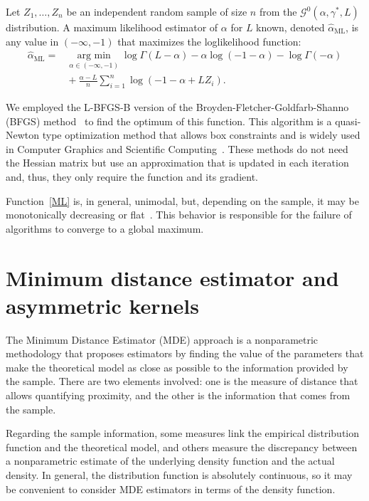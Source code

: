 \documentclass[twocolumn]{svjour3}
\newcommand{\argmin}{\operatorname*{\text{arg min }}}
\begin{document}
	Let $Z_1,\dots, Z_n$ be an independent random sample of size $n$ from the $\mathcal G^0(\alpha,\gamma^*,L)$ distribution.
	A maximum likelihood estimator of $\alpha$ for $L$ known, denoted $\widehat\alpha_{\text{{ML}}}$, is any value in $(-\infty,-1)$ that maximizes the loglikelihood function:
	\begin{align}
	\hat{\alpha}_{\text{{ML}}}=&\argmin_{\alpha \in (-\infty,-1)}\log \Gamma(L-\alpha)-
	\alpha\log(-1-\alpha)-\log\Gamma(-\alpha) \nonumber \\
	&\mbox{}+\frac{\alpha-L}{n} \sum_{i=1}^n\log(-1-\alpha+L Z_i).
	\label{ML}
	\end{align}
	
	We employed the L-BFGS-B version of the Broyden-Fletcher-Goldfarb-Shanno (BFGS) method~\cite{Luenberger2008} to find the optimum of this function. This algorithm is a quasi-Newton type optimization method that allows box constraints and is widely used in Computer Graphics and Scientific Computing~\cite{FEI2014}. 
	These methods do not need the Hessian matrix but use an approximation that is updated in each iteration and, thus, they only require the function and its gradient.
	
	Function~\eqref{ML} is, in general, unimodal, but, depending on the sample, it may be monotonically decreasing or flat~\cite{FreryCribariSouza:JASP:04}. 
	This behavior is responsible for the failure of algorithms to converge to a global maximum.
	
	
	\section{Minimum distance estimator and asymmetric kernels}
	\label{distancekernel}
	
	The Minimum Distance Estimator (MDE) approach is a nonparametric methodology that proposes estimators by finding the value of the parameters that make the theoretical model as close as possible to the information provided by the sample. 
	There are two elements involved: one is the measure of distance that allows quantifying proximity, and the other is the information that comes from the sample.
	
	Regarding the sample information, some measures link the empirical distribution function and the theoretical model, and others measure the discrepancy between a nonparametric estimate of the underlying density function and the actual density. 
	In general, the distribution function is absolutely continuous, so it may be convenient to consider MDE estimators in terms of the density function. 
	
\end{document}
